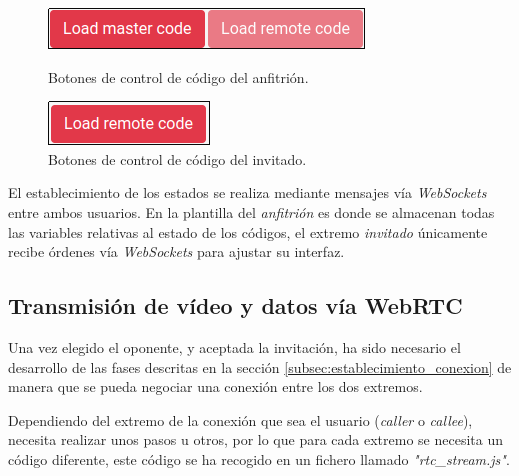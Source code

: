 \documentclass[a4paper, 12pt]{book}
\begin{document}
\begin{figure}[H]
  \centering
  \begin{minipage}[b]{0.4\textwidth}
    \includegraphics[width=\textwidth]{img/host_code_buttons.png}
    \caption{Botones de control de código del anfitrión.}
    \label{figura:robot_davinci}
  \end{minipage}
  \hfill
  \begin{minipage}[b]{0.4\textwidth}
    \includegraphics[width=\textwidth]{img/guest_code_buttons.png}
    \caption{Botones de control de código del invitado.}
    \label{figura:robot_atrias}
  \end{minipage}
\end{figure}

El establecimiento de los estados se realiza mediante mensajes vía \emph{WebSockets} entre ambos usuarios. En la plantilla del \emph{anfitrión} es donde se almacenan todas las variables relativas al estado de los códigos, el extremo \emph{invitado} únicamente recibe órdenes vía \emph{WebSockets} para ajustar su interfaz.

\subsection{Transmisión de vídeo y datos vía WebRTC}

Una vez elegido el oponente, y aceptada la invitación, ha sido necesario el desarrollo de las fases descritas en la sección \ref{subsec:establecimiento_conexion} de manera que se pueda negociar una conexión entre los dos extremos.

Dependiendo del extremo de la conexión que sea el usuario (\emph{caller} o \emph{callee}), necesita realizar unos pasos u otros, por lo que para cada extremo se necesita un código diferente, este código se ha recogido en un fichero llamado \emph{"rtc\_stream.js"}.
\end{document}

